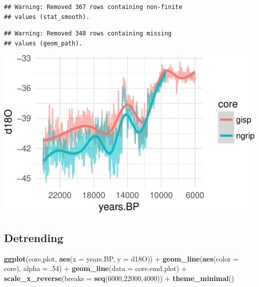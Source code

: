 \documentclass[11pt,]{tufte-handout}
\newenvironment{Shaded}{}{}
\newcommand{\KeywordTok}[1]{\textcolor[rgb]{0.00,0.44,0.13}{\textbf{{#1}}}}
\newcommand{\DataTypeTok}[1]{\textcolor[rgb]{0.56,0.13,0.00}{{#1}}}
\newcommand{\DecValTok}[1]{\textcolor[rgb]{0.25,0.63,0.44}{{#1}}}
\newcommand{\StringTok}[1]{\textcolor[rgb]{0.25,0.44,0.63}{{#1}}}
\newcommand{\NormalTok}[1]{{#1}}
\begin{document}
\begin{verbatim}
## Warning: Removed 367 rows containing non-finite
## values (stat_smooth).
\end{verbatim}

\begin{verbatim}
## Warning: Removed 348 rows containing missing
## values (geom_path).
\end{verbatim}

\includegraphics{proxymodelcomparison_files/figure-latex/unnamed-chunk-5-1}

\subsection{Detrending}\label{detrending}

\begin{Shaded}
\end{Shaded}

\begin{Shaded}
\begin{Highlighting}[]
\KeywordTok{ggplot}\NormalTok{(core.plot, }\KeywordTok{aes}\NormalTok{(}\DataTypeTok{x =} \NormalTok{years.BP, }\DataTypeTok{y =} \NormalTok{d18O)) +}
\StringTok{  }\KeywordTok{geom_line}\NormalTok{(}\KeywordTok{aes}\NormalTok{(}\DataTypeTok{color =} \NormalTok{core), }\DataTypeTok{alpha =} \NormalTok{.}\DecValTok{54}\NormalTok{) +}
\StringTok{  }\KeywordTok{geom_line}\NormalTok{(}\DataTypeTok{data =} \NormalTok{core.emd.plot) +}
\StringTok{  }\KeywordTok{scale_x_reverse}\NormalTok{(}\DataTypeTok{breaks =} \KeywordTok{seq}\NormalTok{(}\DecValTok{6000}\NormalTok{,}\DecValTok{22000}\NormalTok{,}\DecValTok{4000}\NormalTok{)) +}
\StringTok{  }\KeywordTok{theme_minimal}\NormalTok{()}
\end{Highlighting}
\end{Shaded}
\end{document}
